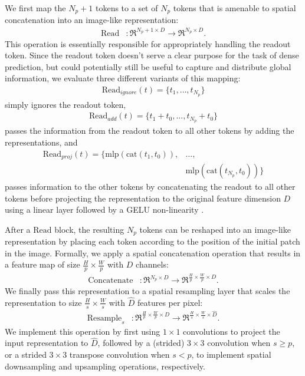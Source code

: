 \documentclass[10pt,twocolumn,letterpaper]{article}
\begin{document}
We first map the $N_{p}+1$ tokens to a set of $N_{p}$ tokens that is amenable to
spatial concatenation into an image-like representation:
\begin{align}
  \textrm{Read}&: \Re^{N_{p}+1 \times D} \rightarrow  \Re^{N_{p} \times D}.
\end{align}
This operation is essentially responsible for appropriately handling the readout
token. Since the readout token doesn't serve a clear purpose for the task of
dense prediction, but could potentially still be useful to capture and
distribute global information, we evaluate three different variants of this
mapping:
\begin{align}
  \textrm{Read}_{ignore}(t) = \{t_{1}, \dots, t_{N_{p}}\}
\end{align}
simply ignores the readout token,
\begin{align}
  \textrm{Read}_{add}(t) = \{t_{1} + t_{0}, \dots, t_{N_{p}} + t_{0}\}
\end{align}
passes the information from the readout token to all other tokens by adding the
representations, and
\begin{align}
  \textrm{Read}_{proj}(t) = \{\textrm{mlp}(\textrm{cat}(t_{1}, t_{0})), &\dots, \nonumber\\
                                                                        &\textrm{mlp}(\textrm{cat}(t_{N_{p}}, t_{0}))\}
\end{align}
passes information to the other tokens by concatenating the readout to all other
tokens before projecting the representation to the original feature dimension
$D$ using a linear layer followed by a GELU non-linearity \cite{Hendrycks1016}.


After a $\textrm{Read}$ block, the resulting $N_{p}$ tokens can be reshaped into an image-like representation by placing each token according to the position
of the initial patch in the image. Formally, we apply a spatial concatenation
operation that results in a feature map of size
${\tfrac{H}{p} \times \tfrac{W}{p}}$ with $D$ channels:
\begin{align}
  \textrm{Concatenate}&: \Re^{N_p \times D} \rightarrow \Re^{\tfrac{H}{p}  \times \tfrac{W}{p} \times D}.
\end{align}
We finally pass this representation to a spatial resampling layer that scales
the representation to size ${\tfrac{H}{s} \times \tfrac{W}{s}}$ with $\hat D$
features per pixel:
\begin{align}
  \textrm{Resample}_{s}&:  \Re^{\tfrac{H}{p}  \times \tfrac{W}{p} \times D} \rightarrow \Re^{\tfrac{H}{s}  \times \tfrac{W}{s} \times \hat D}.
\end{align}
We implement this operation by first using $1 \times 1$ convolutions to project
the input representation to $\hat D$, followed by a (strided) $3\times 3$ convolution
when $s \geq p$,  or a strided $3 \times 3$ transpose convolution when $s < p$, to
implement spatial downsampling and upsampling operations, respectively.
\end{document}
